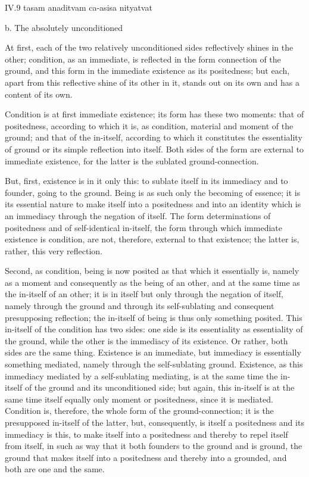 IV.9
tasam anaditvam ca-asisa nityatvat

b. The absolutely unconditioned

At first, each of the two relatively unconditioned sides
reflectively shines in the other;
condition, as an immediate, is reflected
in the form connection of the ground,
and this form in the immediate existence as its positedness;
but each, apart from this reflective shine of its other in it,
stands out on its own and has a content of its own.

Condition is at first immediate existence;
its form has these two moments:
that of positedness, according to which it is, as condition,
material and moment of the ground;
and that of the in-itself, according to which
it constitutes the essentiality of ground
or its simple reflection into itself.
Both sides of the form are external to immediate existence,
for the latter is the sublated ground-connection.

But, first, existence is in it only this:
to sublate itself in its immediacy
and to founder, going to the ground.
Being is as such only the becoming of essence;
it is its essential nature to
make itself into a positedness
and into an identity which is
an immediacy through the negation of itself.
The form determinations of positedness
and of self-identical in-itself,
the form through which immediate existence is condition,
are not, therefore, external to that existence;
the latter is, rather, this very reflection.

Second, as condition, being is now posited as
that which it essentially is,
namely as a moment and consequently as the being of an other,
and at the same time as the in-itself of an other;
it is in itself but only through the negation of itself,
namely through the ground and through its self-sublating
and consequent presupposing reflection;
the in-itself of being is thus only something posited.
This in-itself of the condition has two sides:
one side is its essentiality as essentiality of the ground,
while the other is the immediacy of its existence.
Or rather, both sides are the same thing.
Existence is an immediate, but immediacy
is essentially something mediated,
namely through the self-sublating ground.
Existence, as this immediacy mediated by a self-sublating mediating,
is at the same time the in-itself of the ground and its unconditioned side;
but again, this in-itself is at the same time itself
equally only moment or positedness, since it is mediated.
Condition is, therefore, the whole form of the ground-connection;
it is the presupposed in-itself of the latter,
but, consequently, is itself a positedness
and its immediacy is this, to make itself into a positedness
and thereby to repel itself from itself,
in such as way that it both founders to the ground and is ground,
the ground that makes itself into a positedness
and thereby into a grounded, and both are one and the same.

